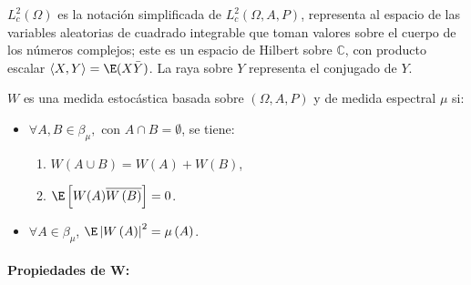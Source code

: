 $L_{c}^{2}\left( \Omega  \right)$ es la notaci\'{o}n simplificada de $L_{c}^{2}\left( \Omega ,A,P \right)$, representa al espacio de las variables aleatorias de cuadrado integrable que toman valores sobre el cuerpo de los n\'{u}meros complejos; este es un espacio de Hilbert sobre $\mathbb{C}$, con producto escalar $\langle X,Y\rangle=\E(X\bar{Y})$. La raya sobre $Y$ representa el conjugado de $Y$.

\begin{definicion}
$W$ es una medida estoc\'{a}stica basada sobre $\left( \Omega,A,P \right)$ y de medida espectral $\mu $ si:
\begin{itemize}
\item $\forall A,B\in \beta_{\mu },$ con $A\cap B=\emptyset $, se tiene:
	\begin{enumerate}
	\item $W\left( A\cup B \right)=W\left( A \right)+W\left( B \right)$,
	\item $\E\left[ W(A)\overline{W\left( B \right)} \right]=0$.
	\end{enumerate}
\item $\forall A\in \beta_{\mu }$, $\E\left| W\left( A \right) \right|^{2}=\mu \left( A \right)$.
\end{itemize}
\end{definicion}

\paragraph{Propiedades de W:}

